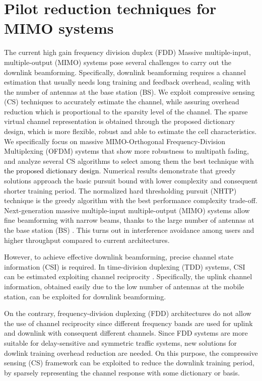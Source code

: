 \chapter{Pilot reduction techniques for MIMO systems}
The current high gain frequency division duplex (FDD) Massive multiple-input, multiple-output (MIMO) systems pose several challenges to carry out the downlink beamforming. Specifically, downlink beamforming requires a channel estimation that usually needs long training and feedback overhead, scaling with the number of antennas at the base station (BS). 
We exploit compressive sensing (CS) techniques to accurately estimate the channel, while assuring overhead reduction which is proportional to the sparsity level of the channel. The sparse virtual channel representation is obtained through the proposed dictionary design, which is more flexible, robust and able to estimate the cell characteristics. 
We specifically focus on massive MIMO-Orthogonal Frequency-Division Multiplexing (OFDM) systems that show more robustness to multipath fading, and analyze several CS algorithms to select among them the best technique with \textcolor{black}{the proposed dictionary design}.
Numerical results demonstrate that greedy solutions approach the basic pursuit bound with lower complexity and consequent shorter training period. The normalized hard thresholding pursuit (NHTP) technique is the greedy algorithm with the best performance complexity trade-off.	
Next-generation massive multiple-input multiple-output (MIMO) systems allow fine beamforming with narrow beams, thanks to the large number of antennas at the base station (BS) \cite{CommMag14} \cite{SPMag13}. This turns out in interference avoidance among users and higher throughput compared to current architectures. 

However, to achieve effective downlink beamforming, precise channel state information (CSI) is required. In time-division duplexing (TDD) systems, CSI can be estimated exploiting channel reciprocity \cite{LearningCS15}. Specifically, the uplink channel information, obtained easily due to the low number of antennas at the mobile station, can be exploited for downlink beamforming. 

On the contrary, frequency-division duplexing (FDD) architectures do not allow the use of channel reciprocity since different frequency bands are used for uplink and downlink with consequent different channels. Since FDD systems are more suitable for delay-sensitive and symmetric traffic systems, new solutions for dowlink training overhead reduction are needed.  
On this purpose, the compressive sensing (CS) framework can be exploited to reduce the downlink training period, by sparsely representing the channel response with some dictionary or basis.

